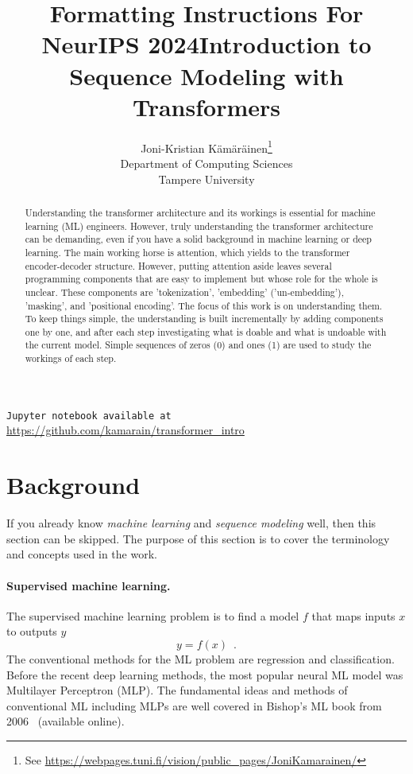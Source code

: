 \documentclass[final]{article}
\title{Formatting Instructions For NeurIPS 2024}
\title{Introduction to Sequence Modeling with Transformers}
\author{%
  Joni-Kristian K{\"a}m{\"a}r{\"a}inen\thanks{See \url{https://webpages.tuni.fi/vision/public_pages/JoniKamarainen/}}\\
  Department of Computing Sciences\\
  Tampere University
}
\begin{document}
\maketitle


\begin{abstract}
  Understanding the transformer architecture and its workings is
  essential for machine learning (ML) engineers. However, truly
  understanding the transformer architecture can be demanding, even if
  you have a solid background in machine learning or deep
  learning. The main working horse is attention, which yields to the
  transformer encoder-decoder structure. However, putting attention
  aside leaves several programming components that are easy to
  implement but whose role for the whole is unclear. These components
  are 'tokenization', 'embedding' ('un-embedding'), 'masking', and
  'positional encoding'. The focus of this work is on understanding
  them. To keep things simple, the understanding is built
  incrementally by adding components one by one, and after each step
  investigating what is doable and what is undoable with the current
  model. Simple sequences of zeros (0) and ones (1) are used to study
  the workings of each step.
\end{abstract}

\begin{center}
\texttt{Jupyter notebook available at} \url{https://github.com/kamarain/transformer_intro}
\end{center}

\section{Background}
If you already know \textit{machine learning} and
\textit{sequence modeling} well, then this section can be skipped. The
purpose of this section is to 
cover the terminology and concepts used in the work.

\paragraph{Supervised machine learning.}
The supervised machine learning problem is to find a model $f$ that
maps inputs $x$ to outputs $y$
\begin{equation}
  y = f(x) \enspace .
  \label{eq:supervisedML}
\end{equation}
The conventional methods for the ML problem are regression and classification.
Before the recent deep learning methods,
the most popular neural ML model was Multilayer Perceptron (MLP). The
fundamental ideas and methods of conventional ML including MLPs are
well covered in Bishop's ML book from 2006~\cite{MLBook}
(available online).
\end{document}
